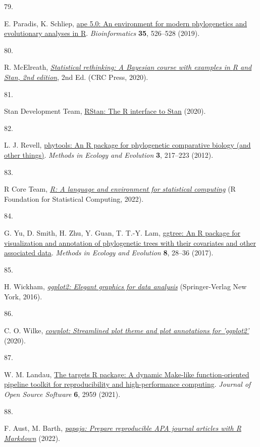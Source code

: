 \documentclass[
  man,floatsintext]{apa6}
\newlength{\cslhangindent}
\newlength{\csllabelwidth}
\newlength{\cslentryspacingunit} %
\newenvironment{CSLReferences}[2] %
 {%
  \setlength{\parindent}{0pt}
  \ifodd #1
  \let\oldpar\par
  \def\par{\hangindent=\cslhangindent\oldpar}
  \fi
  \setlength{\parskip}{#2\cslentryspacingunit}
 }%
 {}
\newcommand{\CSLLeftMargin}[1]{\parbox[t]{\csllabelwidth}{#1}}
\newcommand{\CSLRightInline}[1]{\parbox[t]{\linewidth - \csllabelwidth}{#1}\break}
\begin{document}
\begin{CSLReferences}{0}{0}
\leavevmode{}%
\CSLLeftMargin{79. }%
\CSLRightInline{E. Paradis, K. Schliep, \href{https://doi.org/10.1093/bioinformatics/bty633}{{ape} 5.0: An environment for modern phylogenetics and evolutionary analyses in {R}}. \emph{Bioinformatics} \textbf{35}, 526--528 (2019).}

\leavevmode{}%
\CSLLeftMargin{80. }%
\CSLRightInline{R. McElreath, \emph{\href{http://xcelab.net/rm/statistical-rethinking/}{Statistical rethinking: A {Bayesian} course with examples in {R} and {Stan}, 2nd edition}}, 2nd Ed. (CRC Press, 2020).}

\leavevmode{}%
\CSLLeftMargin{81. }%
\CSLRightInline{Stan Development Team, \href{http://mc-stan.org/}{{RStan}: The {R} interface to {Stan}} (2020).}

\leavevmode{}%
\CSLLeftMargin{82. }%
\CSLRightInline{L. J. Revell, \href{https://doi.org/10.1111/j.2041-210X.2011.00169.x}{{phytools}: An {R} package for phylogenetic comparative biology (and other things)}. \emph{Methods in Ecology and Evolution} \textbf{3}, 217--223 (2012).}

\leavevmode{}%
\CSLLeftMargin{83. }%
\CSLRightInline{R Core Team, \emph{\href{https://www.R-project.org/}{R: A language and environment for statistical computing}} (R Foundation for Statistical Computing, 2022).}

\leavevmode{}%
\CSLLeftMargin{84. }%
\CSLRightInline{G. Yu, D. Smith, H. Zhu, Y. Guan, T. T.-Y. Lam, \href{https://doi.org/10.1111/2041-210X.12628}{{ggtree}: An {R} package for visualization and annotation of phylogenetic trees with their covariates and other associated data}. \emph{Methods in Ecology and Evolution} \textbf{8}, 28--36 (2017).}

\leavevmode{}%
\CSLLeftMargin{85. }%
\CSLRightInline{H. Wickham, \emph{\href{https://ggplot2.tidyverse.org}{{ggplot2}: Elegant graphics for data analysis}} (Springer-Verlag New York, 2016).}

\leavevmode{}%
\CSLLeftMargin{86. }%
\CSLRightInline{C. O. Wilke, \emph{\href{https://CRAN.R-project.org/package=cowplot}{{cowplot}: Streamlined plot theme and plot annotations for 'ggplot2'}} (2020).}

\leavevmode{}%
\CSLLeftMargin{87. }%
\CSLRightInline{W. M. Landau, \href{https://doi.org/10.21105/joss.02959}{The targets {R} package: A dynamic {M}ake-like function-oriented pipeline toolkit for reproducibility and high-performance computing}. \emph{Journal of Open Source Software} \textbf{6}, 2959 (2021).}

\leavevmode{}%
\CSLLeftMargin{88. }%
\CSLRightInline{F. Aust, M. Barth, \emph{\href{https://github.com/crsh/papaja}{{papaja}: {Prepare} reproducible {APA} journal articles with {R Markdown}}} (2022).}

\end{CSLReferences}
\end{document}
